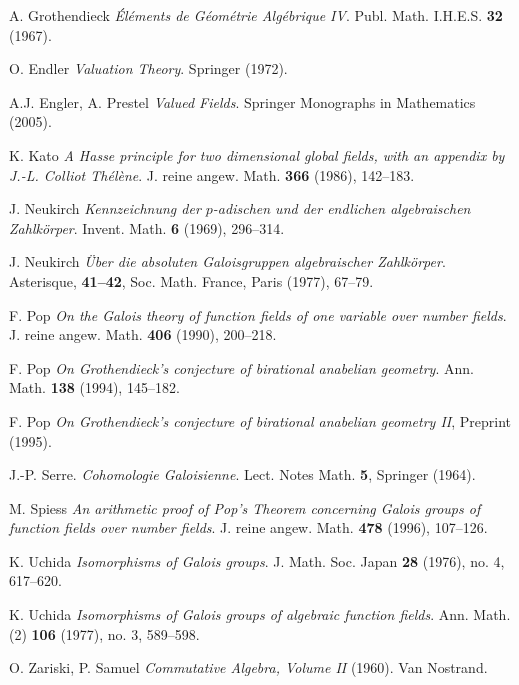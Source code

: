 \begin{thebibliography}{999999}

    A. Grothendieck
    \textit{Éléments de Géométrie Algébrique IV}.
    Publ. Math. I.H.E.S. \textbf{32} (1967).
    
    O. Endler
    \textit{Valuation Theory}.
    Springer (1972).

    A.J. Engler, A. Prestel
    \textit{Valued Fields}.
    Springer Monographs in Mathematics (2005).

    K. Kato
    \textit{A Hasse principle for two dimensional global fields, with an appendix by J.-L. Colliot Thélène}.
    J. reine angew. Math. \textbf{366} (1986), 142\---183.
       
    J. Neukirch
    \textit{Kennzeichnung der $p$-adischen und der endlichen algebraischen Zahlkörper}.
    Invent. Math. \textbf{6} (1969), 296\---314.
    
    J. Neukirch
    \textit{Über die absoluten Galoisgruppen algebraischer Zahlkörper}. Asterisque, \textbf{41\---42}, Soc. Math. France, Paris (1977), 67\---79.
    
    F. Pop
    \textit{On the Galois theory of function fields of one variable over number fields}.
    J. reine angew. Math. \textbf{406} (1990), 200\---218.

    F. Pop
    \textit{On Grothendieck's conjecture of birational anabelian geometry}.
    Ann. Math. \textbf{138} (1994), 145\---182.

    F. Pop
    \textit{On Grothendieck's conjecture of birational anabelian geometry II}, Preprint (1995).
    
    J.-P. Serre.
    \textit{Cohomologie Galoisienne}.
    Lect. Notes Math. \textbf{5}, Springer (1964).
    
	M. Spiess
	\textit{An arithmetic proof of Pop's Theorem concerning Galois groups of function fields over number fields}.
    J. reine angew. Math. \textbf{478} (1996), 107\---126.
   
    K. Uchida
    \textit{Isomorphisms of Galois groups}.
    J. Math. Soc. Japan \textbf{28} (1976), no. 4, 617\---620.

    K. Uchida
    \textit{Isomorphisms of Galois groups of algebraic function fields}.
    Ann. Math. (2) \textbf{106} (1977), no. 3, 589\---598.
  
    O. Zariski, P. Samuel
    \textit{Commutative Algebra, Volume II} (1960). 
    Van Nostrand. 

\end{thebibliography}
